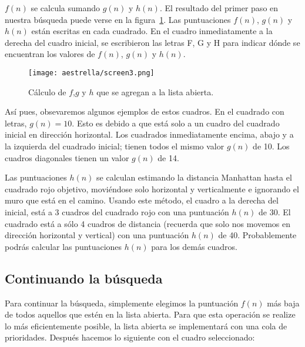 \(f(n)\) se calcula sumando \(g(n)\) y \(h(n)\). El resultado del primer paso en nuestra búsqueda puede verse en la figura~\ref{fig:fig3P4}. Las puntuaciones \(f(n)\), \(g(n)\) y \(h(n)\) están escritas en cada cuadrado. En el cuadro inmediatamente a la derecha del cuadro inicial, se escribieron las letras F, G y H para indicar dónde se encuentran los valores de \(f(n)\), \(g(n)\) y \(h(n)\).

\begin{figure}[h!]
  \centering
  \texttt{[image: aestrella/screen3.png]}
  \caption{Cálculo de \(f\),\(g\) y \(h\) que se agregan a la lista abierta.}
  \label{fig:fig3P4}
\end{figure}

Así pues, obsevaremos algunos ejemplos de estos cuadros. En el cuadrado con letras, \(g(n)=10\). Esto es debido a que está solo a un cuadro del cuadrado inicial en dirección horizontal. Los cuadrados inmediatamente encima, abajo y a la izquierda del cuadrado inicial; tienen todos el mismo valor \(g(n)\) de 10. Los cuadros diagonales tienen un valor \(g(n)\) de 14.

Las puntuaciones \(h(n)\) se calculan estimando la distancia Manhattan hasta el cuadrado rojo objetivo, moviéndose solo horizontal y verticalmente e ignorando el muro que está en el camino. Usando este método, el cuadro a la derecha del inicial, está a 3 cuadros del cuadrado rojo con una puntuación \(h(n)\) de 30. El cuadrado está a sólo 4 cuadros de distancia (recuerda que solo nos movemos en dirección horizontal y vertical) con una puntuación \(h(n)\) de 40. Probablemente podrás calcular las puntuaciones \(h(n)\) para los demás cuadros.


\subsection{Continuando la b\'usqueda}

Para continuar la búsqueda, simplemente elegimos la puntuación \(f(n)\) más baja de todos aquellos que estén en la lista abierta. Para que esta operación se realize lo más eficientemente posible, la lista abierta se implementará con una cola de prioridades. Después hacemos lo siguiente con el cuadro seleccionado:

